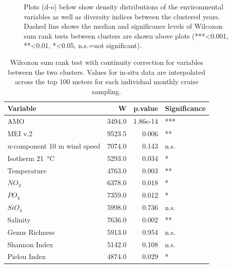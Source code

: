 \documentclass[draft]{agujournal2019}
\begin{document}
\begin{figure}
{Plots (d-o) below show density distributions of the environmental variables as well as diversity indices between the clustered years. Dashed line shows the median and significance levels of Wilcoxon sum rank tests between clusters are shown above plots  (***\textless0.001, **\textless0.01, *\textless0.05, n.s.=not significant).}
\label{fig:clustering}
\end{figure}

\begin{table}
\caption{Wilcoxon sum rank test with continuity correction for variables between the two clusters. Values for in-situ data are interpolated across the top 100 meters for each individual monthly cruise sampling.}
\label{table:clustering}
\centering
\begin{tabular}[t]{lrrl}
\toprule
Variable & W & p.value & Significance\\
\midrule
AMO & 3494.0 & 1.86e-14 & ***\\
MEI v.2 & 9523.5 & 0.006 & **\\
u-component 10 m wind speed & 7074.0 & 0.143 & n.s.\\
Isotherm \qty{21}{\celsius} & 5293.0 & 0.034 & *\\
\addlinespace
Temperature & 4763.0 & 0.003 & **\\
$NO_3$ & 6378.0 & 0.018 & *\\
$PO_4$ & 7359.0 & 0.012 & *\\
$SiO_4$ & 5998.0 & 0.736 & n.s.\\
Salinity & 7636.0 & 0.002 & **\\
\addlinespace
Genus Richness & 5913.0 & 0.954 & n.s.\\
Shannon Index & 5142.0 & 0.108 & n.s.\\
Pielou Index & 4874.0 & 0.029 & *\\
\bottomrule
\end{tabular}
\end{table}
\end{document}
